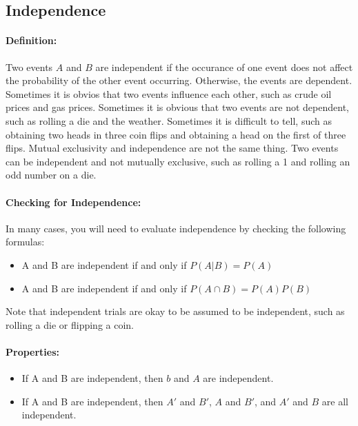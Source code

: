 \subsection{Independence}
\hrulefill

\paragraph*{Definition:}
Two events $A$ and $B$ are independent if the occurance of one event does not affect the probability of the other event occurring.
Otherwise, the events are dependent. Sometimes it is obvios that two events influence each other, such as crude oil prices and 
gas prices. Sometimes it is obvious that two events are not dependent, such as rolling a die and the weather.
Sometimes it is difficult to tell, such as obtaining two heads in three coin flips and obtaining a head on the first of three flips.
Mutual exclusivity and independence are not the same thing. Two events can be independent and not mutually exclusive, such as rolling 
a 1 and rolling an odd number on a die.

\paragraph*{Checking for Independence:}
In many cases, you will need to evaluate independence by checking the following formulas:
\begin{itemize}
    \item A and B are independent if and only if $P(A|B) = P(A)$
    \item A and B are independent if and only if $P(A \cap B) = P(A)P(B)$
\end{itemize}

Note that independent trials are okay to be assumed to be independent, such as rolling a die or flipping a coin.

\paragraph*{Properties:}
\begin{itemize}
    \item If A and B are independent, then $b$ and $A$ are independent.
    \item If A and B are independent, then $A'$ and $B'$, $A$ and $B'$, and $A'$ and $B$ are all independent.
\end{itemize}

\pagebreak

